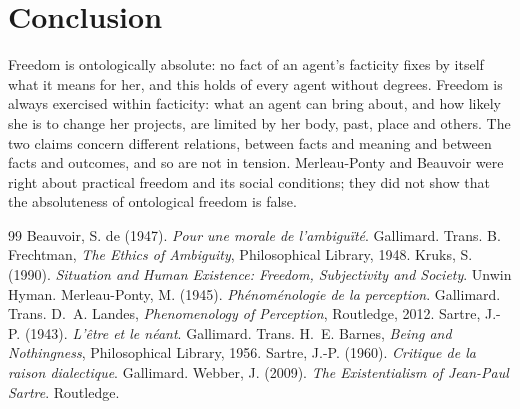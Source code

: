 \documentclass{situationist-preprint}
\begin{document}
\section{Conclusion}

Freedom is ontologically absolute: no fact of an agent's facticity fixes by itself what it means for her, and this holds of every agent without degrees. Freedom is always exercised within facticity: what an agent can bring about, and how likely she is to change her projects, are limited by her body, past, place and others. The two claims concern different relations, between facts and meaning and between facts and outcomes, and so are not in tension. Merleau-Ponty and Beauvoir were right about practical freedom and its social conditions; they did not show that the absoluteness of ontological freedom is false.

\begin{thebibliography}{99}\small
{} Beauvoir, S. de (1947). \emph{Pour une morale de l'ambigu\"it\'e}. Gallimard. Trans. B. Frechtman, \emph{The Ethics of Ambiguity}, Philosophical Library, 1948.
 Kruks, S. (1990). \emph{Situation and Human Existence: Freedom, Subjectivity and Society}. Unwin Hyman.
 Merleau-Ponty, M. (1945). \emph{Ph\'enom\'enologie de la perception}. Gallimard. Trans. D.~A. Landes, \emph{Phenomenology of Perception}, Routledge, 2012.
 Sartre, J.-P. (1943). \emph{L'\^etre et le n\'eant}. Gallimard. Trans. H.~E. Barnes, \emph{Being and Nothingness}, Philosophical Library, 1956.
 Sartre, J.-P. (1960). \emph{Critique de la raison dialectique}. Gallimard.
 Webber, J. (2009). \emph{The Existentialism of Jean-Paul Sartre}. Routledge.
\end{thebibliography}
\end{document}
